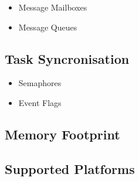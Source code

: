 \begin{itemize}
 \item Message Mailboxes
 \item Message Queues 
\end{itemize}

\subsection{Task Syncronisation}

\begin{itemize}
 \item Semaphores 
 \item Event Flags
\end{itemize}

\subsection{Memory Footprint}

\subsection{Supported Platforms}

